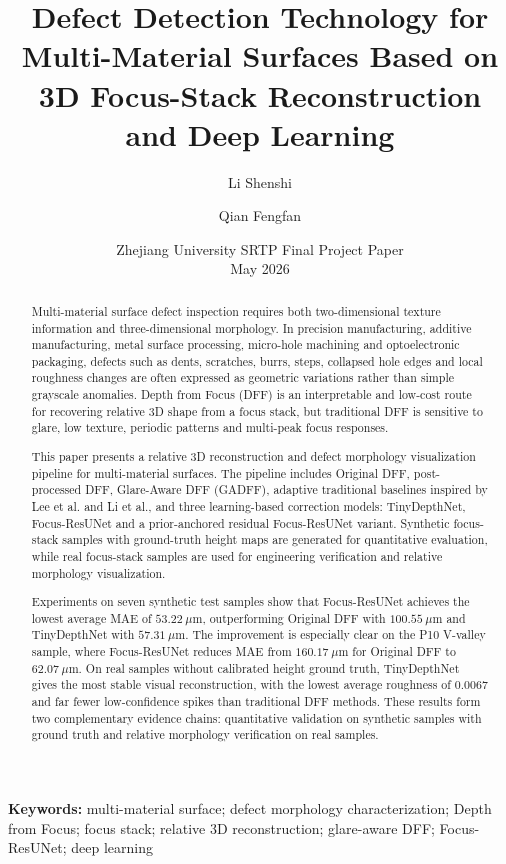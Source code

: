 \documentclass[11pt,a4paper]{article}
\title{Defect Detection Technology for Multi-Material Surfaces Based on 3D Focus-Stack Reconstruction and Deep Learning}
\author{Li Shenshi \and Qian Fengfan}
\date{Zhejiang University SRTP Final Project Paper\\May 2026}
\begin{document}
\maketitle

\begin{abstract}
Multi-material surface defect inspection requires both two-dimensional texture information and three-dimensional morphology. In precision manufacturing, additive manufacturing, metal surface processing, micro-hole machining and optoelectronic packaging, defects such as dents, scratches, burrs, steps, collapsed hole edges and local roughness changes are often expressed as geometric variations rather than simple grayscale anomalies. Depth from Focus (DFF) is an interpretable and low-cost route for recovering relative 3D shape from a focus stack, but traditional DFF is sensitive to glare, low texture, periodic patterns and multi-peak focus responses.

This paper presents a relative 3D reconstruction and defect morphology visualization pipeline for multi-material surfaces. The pipeline includes Original DFF, post-processed DFF, Glare-Aware DFF (GADFF), adaptive traditional baselines inspired by Lee et al. and Li et al., and three learning-based correction models: TinyDepthNet, Focus-ResUNet and a prior-anchored residual Focus-ResUNet variant. Synthetic focus-stack samples with ground-truth height maps are generated for quantitative evaluation, while real focus-stack samples are used for engineering verification and relative morphology visualization.

Experiments on seven synthetic test samples show that Focus-ResUNet achieves the lowest average MAE of \(53.22~\mu\mathrm{m}\), outperforming Original DFF with \(100.55~\mu\mathrm{m}\) and TinyDepthNet with \(57.31~\mu\mathrm{m}\). The improvement is especially clear on the P10 V-valley sample, where Focus-ResUNet reduces MAE from \(160.17~\mu\mathrm{m}\) for Original DFF to \(62.07~\mu\mathrm{m}\). On real samples without calibrated height ground truth, TinyDepthNet gives the most stable visual reconstruction, with the lowest average roughness of 0.0067 and far fewer low-confidence spikes than traditional DFF methods. These results form two complementary evidence chains: quantitative validation on synthetic samples with ground truth and relative morphology verification on real samples.
\end{abstract}

\noindent\textbf{Keywords:} multi-material surface; defect morphology characterization; Depth from Focus; focus stack; relative 3D reconstruction; glare-aware DFF; Focus-ResUNet; deep learning
\end{document}
